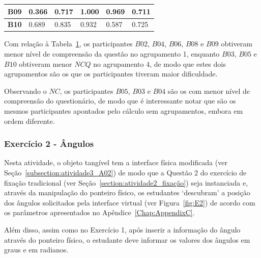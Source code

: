 \begin{table}[htbp]
\begin{tabular}{|c|lllll|}
		\textbf{B09} & \multicolumn{1}{l|}{0.366} & \multicolumn{1}{l|}{0.717} & \multicolumn{1}{l|}{1.000} & \multicolumn{1}{l|}{0.969} & 0.711 \\ \hline
		\rowcolor[HTML]{F2F2F2} 
		\textbf{B10} & \multicolumn{1}{l|}{\cellcolor[HTML]{F2F2F2}0.689} & \multicolumn{1}{l|}{\cellcolor[HTML]{F2F2F2}0.835} & \multicolumn{1}{l|}{\cellcolor[HTML]{F2F2F2}0.932} & \multicolumn{1}{l|}{\cellcolor[HTML]{F2F2F2}0.587} & 0.725 \\ \hline
	\end{tabular}
	\label{tab:F3A1_NC_casos_comagrupamento}
\end{table}

Com relação à Tabela~\ref{tab:F3A1_NC_casos_comagrupamento}, os participantes $B02$, $B04$, $B06$, $B08$ e $B09$ obtiveram menor nível de compreensão da questão no agrupamento 1, enquanto $B03$, $B05$ e $B10$ obtiveram menor $NCQ$ no agrupamento 4, de modo que estes dois agrupamentos são os que os participantes tiveram maior dificuldade.

Observando o $NC$, os participantes $B05$, $B03$ e $B04$ são os com menor nível de compreensão do questionário, de modo que é interessante notar que são os mesmos participantes apontados pelo cálculo sem agrupamentos, embora em ordem diferente.


\subsubsection{Exercício 2 - Ângulos}\label{subsubsec:F3A2}

Nesta atividade, o objeto tangível tem a interface física modificada (ver Seção~\ref{subsection:atividade3_A02}) de modo que a Questão 2 do exercício de fixação tradicional (ver Seção~\ref{section:atividade2_fixação}) seja instanciada e, através da manipulação do ponteiro físico, os estudantes `descubram' a posição dos ângulos solicitados pela interface virtual (ver Figura~\ref{fig:E2}) de acordo com os parâmetros apresentados no Apêndice~\ref{Chap:AppendixC}.%

Além disso, assim como no Exercício 1, após inserir a informação do ângulo através do ponteiro físico, o estudante deve informar os valores dos ângulos em graus e em radianos.

